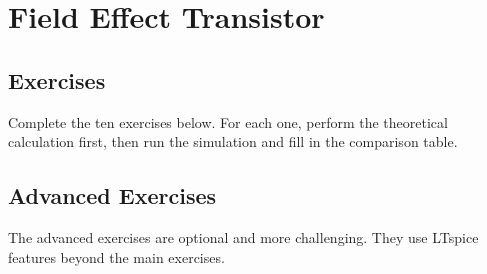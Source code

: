 \chapter{Field Effect Transistor}




\clearpage
\section{Exercises}
Complete the ten exercises below. For each one, perform the theoretical calculation first,
then run the simulation and fill in the comparison table.












\clearpage
\section{Advanced Exercises}
The advanced exercises are optional and more challenging. They use LTspice features beyond the main exercises.





